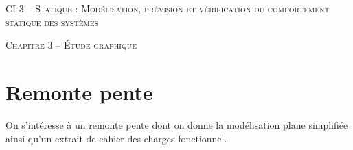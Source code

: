 \documentclass[11pt,oneside]{article}
\begin{document}
\pagestyle{fancy}
\renewcommand{\headrulewidth}{0pt}

\fancyhead{}

\fancyhead[C]{\rule{12cm}{.5pt}}


\renewcommand{\footrulewidth}{0.2pt}

\fancyfoot[C]{\footnotesize{\bfseries \thepage}}



\begin{center}
 \huge\textsc{CI 3 -- Statique : Modélisation, prévision et vérification du comportement statique des systèmes}
\end{center}

\begin{center}
 \LARGE\textsc{Chapitre 3 -- Étude graphique} 
\end{center}

\vspace{.5cm}


\section*{Remonte pente}

On s'intéresse à un remonte pente dont on donne la modélisation plane simplifiée ainsi qu'un extrait de cahier des charges fonctionnel.
\end{document}
